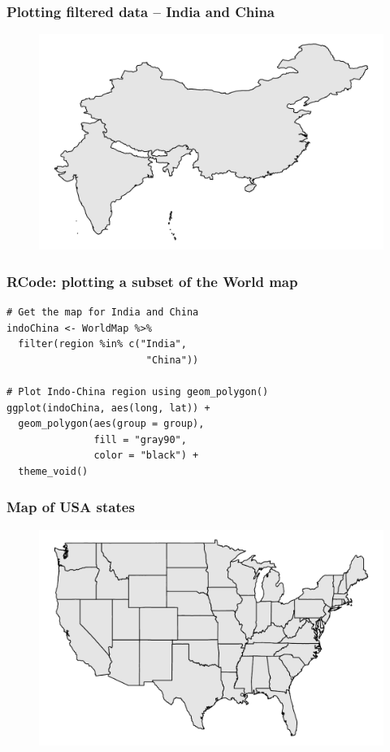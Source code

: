\documentclass{beamer}
\begin{document}
\begin{frame}\frametitle{Plotting filtered data -- India and China}
\begin{figure}
\includegraphics[width=0.99\linewidth]{PlotsLec4/IndoChinaMap}
\end{figure}
\end{frame}

\begin{frame}[fragile]\frametitle{RCode: plotting a subset of the World map}
\begin{lstlisting}
# Get the map for India and China
indoChina <- WorldMap %>% 
  filter(region %in% c("India",
                        "China"))

# Plot Indo-China region using geom_polygon()
ggplot(indoChina, aes(long, lat)) +
  geom_polygon(aes(group = group),
               fill = "gray90",
               color = "black") +
  theme_void() 
\end{lstlisting}
\end{frame}

\begin{frame}\frametitle{Map of USA states}
\begin{figure}
\includegraphics[width=0.99\linewidth]{PlotsLec4/UsaMap}
\end{figure}
\end{frame}
\end{document}
